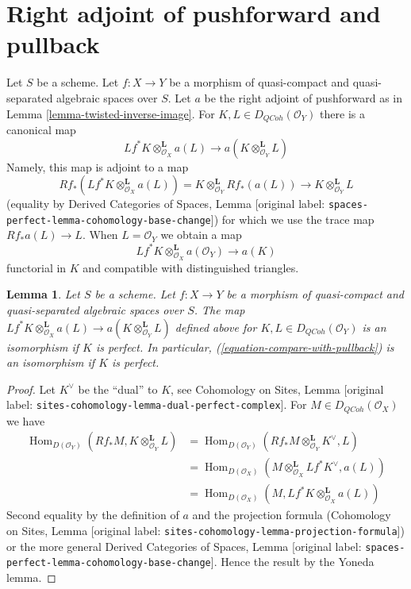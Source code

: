 \documentclass[10pt,a4paper]{article}
\theoremstyle{plain}
\newtheorem{lemma}[subsection]{Lemma}
\theoremstyle{definition}
\theoremstyle{remark}
\numberwithin{equation}{subsection}
\def\Hom{\mathop{\mathrm{Hom}}\nolimits}
\def\QCoh{\mathit{QCoh}}
\begin{document}
\section{Right adjoint of pushforward and pullback}
\label{section-compare-with-pullback}

\noindent
Let $S$ be a scheme.
Let $f : X \to Y$ be a morphism of quasi-compact and quasi-separated
algebraic spaces over $S$.
Let $a$ be the right adjoint of pushforward as in
Lemma \ref{lemma-twisted-inverse-image}. For $K, L \in D_\QCoh(\mathcal{O}_Y)$
there is a canonical map
$$
Lf^*K \otimes^\mathbf{L}_{\mathcal{O}_X} a(L)
\longrightarrow
a(K \otimes_{\mathcal{O}_Y}^\mathbf{L} L)
$$
Namely, this map is adjoint to a map
$$
Rf_*(Lf^*K \otimes^\mathbf{L}_{\mathcal{O}_X} a(L)) =
K \otimes^\mathbf{L}_{\mathcal{O}_Y} Rf_*(a(L))
\longrightarrow
K \otimes^\mathbf{L}_{\mathcal{O}_Y} L
$$
(equality by Derived Categories of Spaces, Lemma
\textnormal{[original label: \nolinkurl{spaces-perfect-lemma-cohomology-base-change}]})
for which we use the trace map $Rf_*a(L) \to L$.
When $L = \mathcal{O}_Y$ we obtain a map
\begin{equation}
\label{equation-compare-with-pullback}
Lf^*K \otimes^\mathbf{L}_{\mathcal{O}_X} a(\mathcal{O}_Y) \longrightarrow a(K)
\end{equation}
functorial in $K$ and compatible with distinguished triangles.

\begin{lemma}
\label{lemma-compare-with-pullback-perfect}
Let $S$ be a scheme.
Let $f : X \to Y$ be a morphism of quasi-compact and quasi-separated
algebraic spaces over $S$. The map
$Lf^*K \otimes^\mathbf{L}_{\mathcal{O}_X} a(L) \to
a(K \otimes_{\mathcal{O}_Y}^\mathbf{L} L)$
defined above for $K, L \in D_\QCoh(\mathcal{O}_Y)$
is an isomorphism if $K$ is perfect. In particular,
(\ref{equation-compare-with-pullback}) is an isomorphism if $K$ is perfect.
\end{lemma}

\begin{proof}
Let $K^\vee$ be the ``dual'' to $K$, see
Cohomology on Sites, Lemma \textnormal{[original label: \nolinkurl{sites-cohomology-lemma-dual-perfect-complex}]}.
For $M \in D_\QCoh(\mathcal{O}_X)$ we have
\begin{align*}
\Hom_{D(\mathcal{O}_Y)}(Rf_*M, K \otimes^\mathbf{L}_{\mathcal{O}_Y} L)
& =
\Hom_{D(\mathcal{O}_Y)}(
Rf_*M \otimes^\mathbf{L}_{\mathcal{O}_Y} K^\vee, L) \\
& =
\Hom_{D(\mathcal{O}_X)}(
M \otimes^\mathbf{L}_{\mathcal{O}_X} Lf^*K^\vee, a(L)) \\
& =
\Hom_{D(\mathcal{O}_X)}(M,
Lf^*K \otimes^\mathbf{L}_{\mathcal{O}_X} a(L))
\end{align*}
Second equality by the definition of $a$ and the projection formula
(Cohomology on Sites, Lemma
\textnormal{[original label: \nolinkurl{sites-cohomology-lemma-projection-formula}]})
or the more general Derived Categories of Spaces, Lemma
\textnormal{[original label: \nolinkurl{spaces-perfect-lemma-cohomology-base-change}]}.
Hence the result by the Yoneda lemma.
\end{proof}
\end{document}

